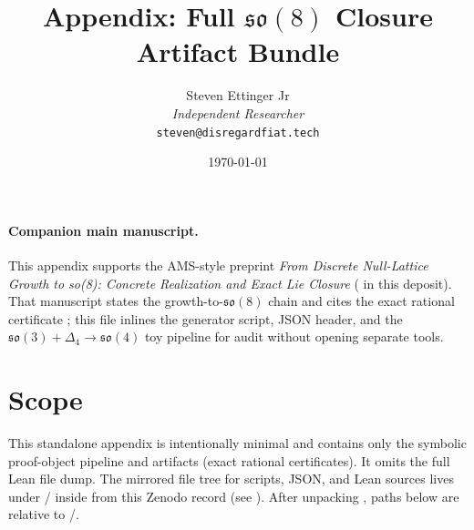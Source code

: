 \documentclass[11pt]{article}
\title{Appendix: Full \texorpdfstring{$\mathfrak{so}(8)$}{so(8)} Closure Artifact Bundle}
\author{Steven Ettinger Jr\\\textit{Independent Researcher}\\\texttt{steven@disregardfiat.tech}}
\date{\today}
\begin{document}
\maketitle

\paragraph{Companion main manuscript.}
This appendix supports the AMS-style preprint \emph{From Discrete Null-Lattice Growth to so(8): Concrete Realization and Exact Lie Closure} ( in this deposit). That manuscript states the growth-to-\(\mathfrak{so}(8)\) chain and cites the exact rational certificate ; this file inlines the generator script, JSON header, and the \(\mathfrak{so}(3)+\Delta_4\to\mathfrak{so}(4)\) toy pipeline for audit without opening separate tools.



\section*{Scope}
\begin{sloppypar}
This standalone appendix is intentionally minimal and contains only the symbolic
proof-object pipeline and artifacts (exact rational certificates). It omits the
full Lean file dump.
The mirrored file tree for scripts, JSON, and Lean sources lives under \PaperReproBundleDir/ inside \CompanionCodeZip{} from this Zenodo record (see \PaperReproBundleManifest).
After unpacking \CompanionCodeZip{}, paths below are relative to \PaperReproBundleDir/.
\end{sloppypar}
\end{document}
